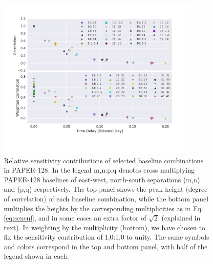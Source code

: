 \documentclass[twocolumn,apj,numberedappendix]{emulateapj}
\renewcommand\[{\begin{equation}}
\renewcommand\]{\end{equation}}
\begin{document}
\begin{figure}[h!]
\includegraphics[width=0.9\textwidth]{sensitivity}

\caption{Relative sensitivity contributions of selected baseline combinations in PAPER-128. In the legend m,n:p,q denotes cross
multiplying PAPER-128 baselines of east-west, north-south separations (m,n) and (p,q) respectively. The top
panel shows the peak height (degree of correlation) of each baseline
combination, while the bottom panel multiplies the heights by the
corresponding multiplicities as in Eq. \eqref{eq:sensul}, and in some cases an extra factor of $\sqrt{2}$ (explained in text). 
In weighting by the multiplicity (bottom), we have chosen to fix the sensitivity 
contribution of 1,0:1,0 to unity. The same symbols and colors correspond in the top and bottom panel, with half of the legend shown in each. }
\label{fig:sensplot}
\end{figure}
\end{document}
